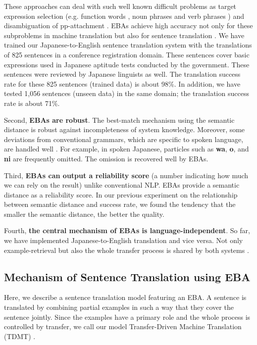 These approaches can deal with such well known difficult problems as
target expression 
selection (e.g. function words \cite{Sumita92a,Sumita92b}, 
noun phrases \cite{Sato93a} and verb phrases \cite{Sato91}) 
and disambiguation of pp-attachment \cite{Sumita93a}.
EBAs achieve high accuracy not only for 
these subproblems in machine translation but also 
for sentence translation \cite{FuruseE94}.
We have trained our Japanese-to-English sentence translation system
with the translations of 825 sentences
in a conference registration domain.
These sentences cover basic expressions used in Japanese aptitude
tests conducted by the government. These sentences were
reviewed by Japanese linguists as well. 
The translation
success rate for these 825 sentences (trained data) is about 98\%. 
In addition, we have tested 
1,056 sentences (unseen data) in the same domain;
the translation success rate is about 71\%.

Second, {\bf EBAs are robust}. 
The best-match mechanism using the semantic distance
is robust against incompleteness of system knowledge. 
Moreover, some deviations  from conventional grammars, 
which are specific to spoken 
language, are handled well \cite{Furuse92}. 
For example, in spoken 
Japanese, particles such
as {\bf wa}, {\bf o}, and {\bf ni} are frequently omitted. The omission is 
recovered well by EBAs.

Third, {\bf EBAs can output a reliability score} (a number indicating
how much we 
can rely on the result) unlike conventional NLP.
EBAs provide a 
semantic distance
as a reliability score. In our previous experiment 
\cite{Sumita92b} on the relationship between semantic 
distance and success rate, we found 
the tendency that the smaller the semantic distance, the
better the quality.

Fourth, {\bf the central mechanism of EBAs is language-independent}.
So far, we have implemented Japanese-to-English translation and vice versa.
Not only example-retrieval but also the whole transfer process
is shared by both systems \cite{Sobashima94}.

\subsection{Mechanism of Sentence Translation using EBA}\label{sec-mec}

Here, we describe a sentence translation model featuring an EBA.
A sentence is translated by combining partial examples in such a way that 
they cover the sentence jointly.
Since the examples  have a primary role and the whole 
process is controlled by transfer, we call our model 
Transfer-Driven Machine Translation (TDMT) \cite{Furuse92,FuruseE94,Furuse94b}.

